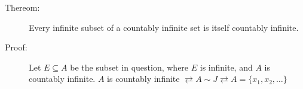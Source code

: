 	\begin{description}
		\item[Thereom:] Every infinite subset of a countably infinite set is itself countably infinite.
		\item[Proof:] Let $E \subseteq A$ be the subset in question, where $E$ is infinite, and $A$ is countably infinite. $A$ is countably infinite $\rightleftarrow A\sim J \rightleftarrow A = \{x_1,x_2,\dots\}$

	\end{description}
